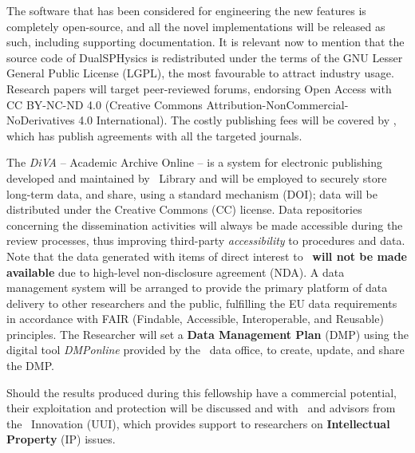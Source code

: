 The software that has been considered for engineering the new features is completely open-source, and all the novel implementations will be released as such, including supporting documentation. It is relevant now to mention that the source code of DualSPHysics is redistributed under the terms of the GNU Lesser General Public License (LGPL), the most favourable to attract industry usage. %
Research papers will target peer-reviewed forums, endorsing Open Access with CC BY-NC-ND 4.0 (Creative Commons Attribution-NonCommercial-NoDerivatives 4.0 International). The costly publishing fees will be covered by \UU, which has publish agreements with all the targeted journals.

The \textit{DiVA} -- Academic Archive Online -- is a system for electronic publishing developed and maintained by \UU\ Library and will be employed to securely store long-term data, and share, using a standard mechanism (DOI); data will be distributed under the Creative Commons (CC) license. Data repositories concerning the dissemination activities will always be made accessible during the review processes, thus improving third-party \textit{accessibility} to procedures and data. Note that the data generated with items of direct interest to \Hexicon\ \textbf{will not be made available} due to high-level non-disclosure agreement (NDA). A data management system will be arranged to provide the primary platform of data delivery to other researchers and the public, fulfilling the EU data requirements in accordance with FAIR (Findable, Accessible, Interoperable, and Reusable) principles. The Researcher will set a \textbf{Data Management Plan} (DMP) using the digital tool \textit{DMPonline} provided by the \UU\ data office, to create, update, and share the DMP. 

Should the results produced during this fellowship have a commercial potential, their exploitation and protection will be discussed and with \Hexicon\ and advisors from the \UU\ Innovation (UUI), which provides support to researchers on \textbf{Intellectual Property} (IP) issues. 
\vspace{-2ex}

